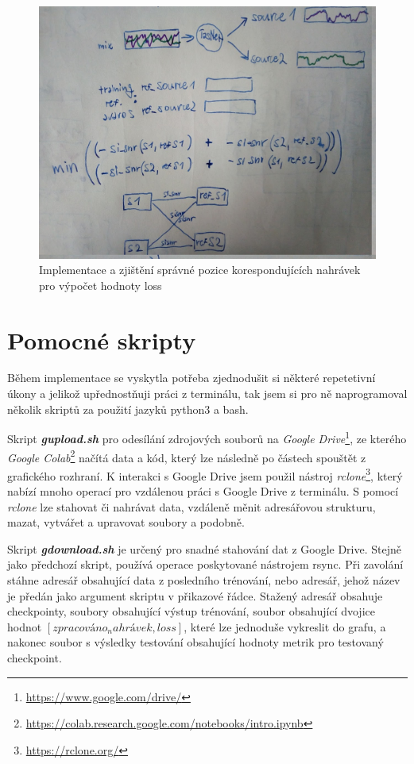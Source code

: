 \begin{figure}[H]
    \centering
    \includegraphics[scale=0.25]{obrazky-figures/sisnr_cross_calculation.jpg}
    \caption{\label{fig:implementace_loss_sisnr} Implementace a zjištění správné pozice korespondujících nahrávek pro výpočet hodnoty loss}
\end{figure}



\section{Pomocné skripty}
Během implementace se vyskytla potřeba zjednodušit si některé repetetivní úkony a jelikož upřednostňuji práci z terminálu, tak jsem si pro ně naprogramoval několik skriptů za použití jazyků python3 a bash. 

Skript \textbf{\textit{gupload.sh}} pro odesílání zdrojových souborů na \textit{Google Drive}\footnote{\url{https://www.google.com/drive/}}, ze kterého \textit{Google Colab}\footnote{\url{https://colab.research.google.com/notebooks/intro.ipynb}} načítá data a kód, který lze následně po částech spouštět z grafického rozhraní. K interakci s Google Drive jsem použil nástroj \textit{rclone}\footnote{\url{https://rclone.org/}}, který nabízí mnoho operací pro vzdálenou práci s Google Drive z terminálu. S pomocí \textit{rclone} lze stahovat či nahrávat data, vzdáleně měnit adresářovou strukturu, mazat, vytvářet a upravovat soubory a podobně. 

Skript \textbf{\textit{gdownload.sh}} je určený pro snadné stahování dat z Google Drive. Stejně jako předchozí skript, používá operace poskytované nástrojem rsync. Při zavolání stáhne adresář obsahující data z posledního trénování, nebo adresář, jehož název je předán jako argument skriptu v přikazové řádce.   
Stažený adresář obsahuje checkpointy, soubory obsahující výstup trénování, soubor obsahující dvojice hodnot $[zpracováno_nahrávek, loss]$, které lze jednoduše vykreslit do grafu, a nakonec soubor s výsledky testování obsahující hodnoty metrik pro testovaný checkpoint.

